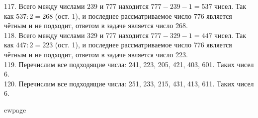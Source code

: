 117. Всего между числами 239 и 777 находится $777-239-1=537$ чисел. Так как $537:2=268$ (ост. 1), и последнее рассматриваемое число 776 является чётным и не подходит, ответом в задаче является число 268.\\
118. Всего между числами 329 и 777 находится $777-329-1=447$ чисел. Так как $447:2=223$ (ост. 1), и последнее рассматриваемое число 776 является чётным и не подходит, ответом в задаче является число 223.\\
119. Перечислим все подходящие числа: 241, 223, 205, 421, 403, 601. Таких чисел 6.\\
120. Перечислим все подходящие числа: 251, 233, 215, 431, 413, 611. Таких чисел 6.

ewpage
